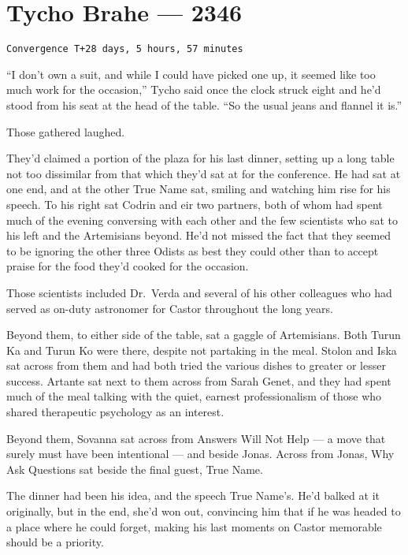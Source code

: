\hypertarget{tycho-brahe-2346}{%
\chapter{Tycho Brahe — 2346}\label{tycho-brahe-2346}}

\begin{verbatim}
Convergence T+28 days, 5 hours, 57 minutes
\end{verbatim}

``I don't own a suit, and while I could have picked one up, it seemed like too much work for the occasion,'' Tycho said once the clock struck eight and he'd stood from his seat at the head of the table. ``So the usual jeans and flannel it is.''

Those gathered laughed.

They'd claimed a portion of the plaza for his last dinner, setting up a long table not too dissimilar from that which they'd sat at for the conference. He had sat at one end, and at the other True Name sat, smiling and watching him rise for his speech. To his right sat Codrin and eir two partners, both of whom had spent much of the evening conversing with each other and the few scientists who sat to his left and the Artemisians beyond. He'd not missed the fact that they seemed to be ignoring the other three Odists as best they could other than to accept praise for the food they'd cooked for the occasion.

Those scientists included Dr.~Verda and several of his other colleagues who had served as on-duty astronomer for Castor throughout the long years.

Beyond them, to either side of the table, sat a gaggle of Artemisians. Both Turun Ka and Turun Ko were there, despite not partaking in the meal. Stolon and Iska sat across from them and had both tried the various dishes to greater or lesser success. Artante sat next to them across from Sarah Genet, and they had spent much of the meal talking with the quiet, earnest professionalism of those who shared therapeutic psychology as an interest.

Beyond them, Sovanna sat across from Answers Will Not Help — a move that surely must have been intentional — and beside Jonas. Across from Jonas, Why Ask Questions sat beside the final guest, True Name.

The dinner had been his idea, and the speech True Name's. He'd balked at it originally, but in the end, she'd won out, convincing him that if he was headed to a place where he could forget, making his last moments on Castor memorable should be a priority.

